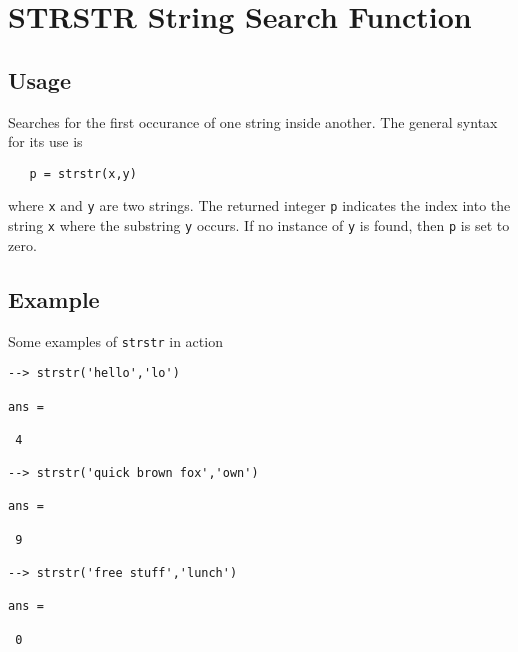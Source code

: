 \section{STRSTR String Search Function}

\subsection{Usage}

Searches for the first occurance of one string inside another.
The general syntax for its use is
\begin{verbatim}
   p = strstr(x,y)
\end{verbatim}
where \verb|x| and \verb|y| are two strings.  The returned integer \verb|p|
indicates the index into the string \verb|x| where the substring \verb|y|
occurs.  If no instance of \verb|y| is found, then \verb|p| is set to
zero.
\subsection{Example}

Some examples of \verb|strstr| in action
\begin{verbatim}
--> strstr('hello','lo')

ans = 

 4 

--> strstr('quick brown fox','own')

ans = 

 9 

--> strstr('free stuff','lunch')

ans = 

 0 
\end{verbatim}
